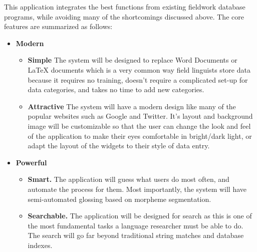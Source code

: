 \documentclass[12 pt]{article}
\begin{document}
This application integrates the best functions from existing fieldwork database programs, while avoiding many of the shortcomings discussed above. The core features are summarized as follows: 

\begin{itemize}


\item {\bf Modern}

\begin{itemize}
\item { \bf Simple} The system will be designed to replace Word Documents or LaTeX documents which is a very common way field linguists store data because it requires no training, doesn't require a complicated set-up for data categories, and takes no time to add new categories.  

\item {\bf Attractive} The system will have a modern design like many of the popular websites such as Google and Twitter. It's layout and background image will be customizable so that the user can change the look and feel of the application to make their eyes comfortable  in bright/dark light, or adapt the layout of the widgets to their style of data entry.
\end{itemize}

\item {\bf Powerful}
\begin{itemize}
\item {\bf Smart.} The application will guess what users do most often, and automate the process for them. Most importantly, the system will have semi-automated  glossing based on morpheme segmentation.
\item {\bf  Searchable.} The application will be designed for search as this is one of the most fundamental tasks a language researcher must be able to do. The search will go far beyond traditional string matches and database indexes.
\end{itemize}


\end{itemize}
\end{document}
